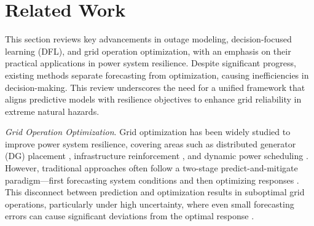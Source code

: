 \section{Related Work}
\label{sec:ref}
This section reviews key advancements in outage modeling, decision-focused learning (DFL), and grid operation optimization, with an emphasis on their practical applications in power system resilience. Despite significant progress, existing methods separate forecasting from optimization, causing inefficiencies in decision-making. This review underscores the need for a unified framework that aligns predictive models with  resilience objectives to enhance grid reliability in extreme natural hazards.

\vspace{.05in}
\noindent\emph{Grid Operation Optimization}.
Grid optimization has been widely studied to improve power system resilience, covering areas such as distributed generator (DG) placement \cite{8668633,QIN2024752,9117454}, infrastructure reinforcement \cite{8273985}, and dynamic power scheduling \cite{5963580,990600}. However, traditional approaches often follow a two-stage predict-and-mitigate paradigm—first forecasting system conditions and then optimizing responses \cite{7080837}. This disconnect between prediction and optimization results in suboptimal grid operations, particularly under high uncertainty, where even small forecasting errors can cause significant deviations from the optimal response \cite{10711393,10855832}.


